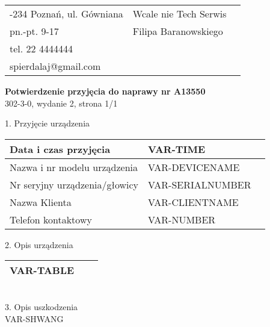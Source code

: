 \documentclass{article}
\begin{document}
\begin{tabularx}{\textwidth} { 
   >{\raggedright\arraybackslash}X 
   >{\centering\arraybackslash}X 
   >{\raggedleft\arraybackslash}X  }

61-234 Poznań, ul. Gówniana & \hspace{4mm} Wcale nie Tech Serwis \\
pn.-pt. 9-17 & \hspace{4mm}  Filipa Baranowskiego\\
tel. 22 4444444 &\\
spierdalaj@gmail.com &\\
\end{tabularx}


\begin{center}
\textbf{Potwierdzenie przyjęcia do naprawy nr A13550} \\
302-3-0, wydanie 2, strona 1/1\\
\end{center}

1. Przyjęcie urządzenia\\
\begin{tabularx}{\textwidth} { 
  | >{\raggedright\arraybackslash}X 
  | >{\centering\arraybackslash}X 
  | >{\raggedleft\arraybackslash}X | }
\hline 
 Data i czas przyjęcia & VAR-TIME \\ 
\hline
 Nazwa i nr modelu urządzenia & VAR-DEVICENAME  \\  
\hline
 Nr seryjny urządzenia/głowicy & VAR-SERIALNUMBER   \\
\hline
Nazwa Klienta & VAR-CLIENTNAME \\
\hline
Telefon kontaktowy & VAR-NUMBER \\
\hline
\end{tabularx}\vspace{2mm}
2. Opis urządzenia \\
\vspace{2mm}
\begin{tabularx}{\textwidth} { 
  | >{\raggedright\arraybackslash}X 
  | >{\centering\arraybackslash}X 
  | >{\raggedleft\arraybackslash}X | }
\hline 
VAR-TABLE \\
\hline
\end{tabularx} \vspace{1mm} \\
3. Opis uszkodzenia \\
VAR-SHWANG
\end{document}
